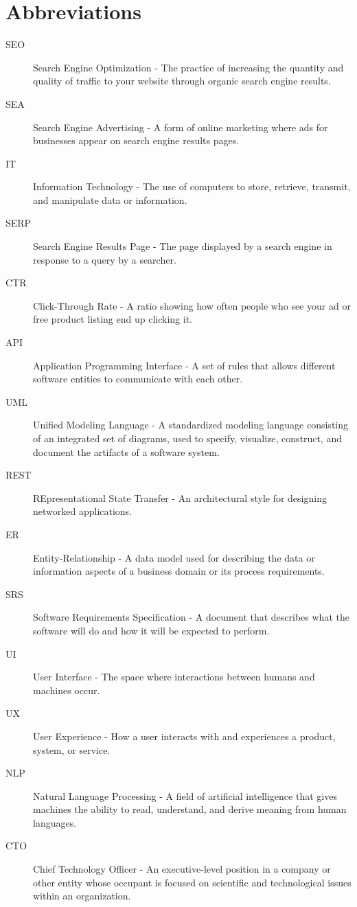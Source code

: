 \documentclass[12pt,a4paper]{article}
\begin{document}
\section*{Abbreviations}
\begin{description}
    \item[SEO] Search Engine Optimization - The practice of increasing the quantity and quality of traffic to your website through organic search engine results.
    \item[SEA] Search Engine Advertising - A form of online marketing where ads for businesses appear on search engine results pages.
    \item[IT] Information Technology - The use of computers to store, retrieve, transmit, and manipulate data or information.
    \item[SERP] Search Engine Results Page - The page displayed by a search engine in response to a query by a searcher.
    \item[CTR] Click-Through Rate - A ratio showing how often people who see your ad or free product listing end up clicking it.
    \item[API] Application Programming Interface - A set of rules that allows different software entities to communicate with each other.
    \item[UML] Unified Modeling Language - A standardized modeling language consisting of an integrated set of diagrams, used to specify, visualize, construct, and document the artifacts of a software system.
    \item[REST] REpresentational State Transfer - An architectural style for designing networked applications.
    \item[ER] Entity-Relationship - A data model used for describing the data or information aspects of a business domain or its process requirements.
    \item[SRS] Software Requirements Specification - A document that describes what the software will do and how it will be expected to perform.
    \item[UI] User Interface - The space where interactions between humans and machines occur.
    \item[UX] User Experience - How a user interacts with and experiences a product, system, or service.
    \item[NLP] Natural Language Processing - A field of artificial intelligence that gives machines the ability to read, understand, and derive meaning from human languages.
    \item[CTO] Chief Technology Officer - An executive-level position in a company or other entity whose occupant is focused on scientific and technological issues within an organization.
\end{description}
\newpage
\end{document}
